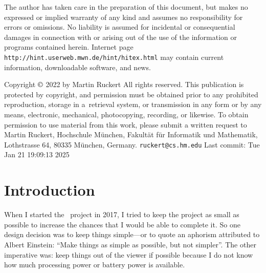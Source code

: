 \titletrue
\begingroup
\figrm
\parindent=0pt

{\raggedright\advance\rightskip 3.5pc 
The author has taken care in the preparation of this document,
but makes no expressed or implied warranty of any kind and assumes no
responsibility for errors or omissions. No liability is assumed for
incidental or consequential damages in connection with or arising out
of the use of the information or programs contained herein.
\bigskip
{\def\:{\discretionary{}{}{}}
Internet page  {\tt http:\://hint.\:userweb.\:mwn.\:de/\:hint/hitex.html}
may contain current information, downloadable software,
and news.}

\vfill
Copyright $\copyright$ 2022 by Martin Ruckert
\smallskip
All rights reserved.
\smallskip
This publication is protected by copyright, and permission must be
obtained prior to any prohibited reproduction, storage in
a~retrieval system, or transmission in any form or by any means, electronic,
mechanical, photocopying, recording, or likewise.
To obtain permission to use material from this work, please submit a written
request to Martin Ruckert,
Hochschule M\"unchen,
Fakult\"at f\"ur Informatik und Mathematik,
Lothstrasse 64,
80335 M\"unchen,
Germany.
\medskip
{\tt ruckert\:@cs.hm.edu}
\medskip
Last commit: Tue Jan 21 19:09:13 2025
\par
}
\eject
\endgroup

\frontmatter
{}%

\tableofcontent

\mainmatter

\def\rule#1:#2.{\par{\hangindent32pt\hangafter1\parindent0pt\rightskip 0pt plus 60pt#1{\bf:}\quad%
  \hskip 0pt plus 60pt\penalty-300\hskip 0pt plus -60pt#2{\bf.}\par}}
\def\prim#1.{\par{\hangindent32pt\hangafter1\parindent0pt\rightskip 0pt plus 60pt#1\par}}  
\def\sym#1{$\left<\right.${\it #1\/}$\left.\right>$}
\def\OR{${}\vert{}$}
\def\opt#1{$\left[\right.$#1$\left.\right]$}
\def\ctl#1{{\tt\BS #1}}


\section{Introduction}
When I started the \HINT\ project in 2017,
I tried to keep the project as small as possible to increase the
chances that I would be able to complete it. So one design decision
was to keep things simple---or to quote an aphorism attributed to
Albert Einstein: ``Make things as simple as possible, but not simpler''.
The other imperative was:
keep things out of the viewer if possible because I do not know
how much processing power or battery power is available.

